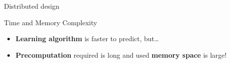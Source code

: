 \documentclass[aspectratio=169]{beamer}
\begin{document}
\begin{frame}{Distributed design}
\end{frame}


\begin{frame}{Time and Memory Complexity}
  \begin{itemize}[<+->]
    \item \textbf{Learning algorithm} is faster to predict, but\ldots
    \item \textbf{Precomputation} required is long and used \textbf{memory space} is large!
  \end{itemize}
\end{frame}
\end{document}
